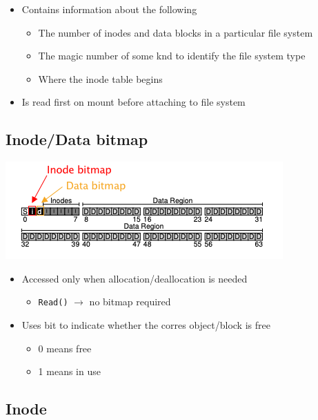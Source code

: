 \documentclass[12pt]{article}
\begin{document}
\begin{itemize}
    \item Contains information about the following
    \begin{itemize}
        \item The number of inodes and data blocks in a particular file system
        \item The magic number of some knd to identify the file system type
        \item Where the inode table begins
    \end{itemize}

    \item Is read first on mount before attaching to file system
\end{itemize}


\subsection{Inode/Data bitmap}

\begin{center}
\includegraphics[width=\linewidth]{../images/midterm_2_solution_22.png}
\end{center}

\begin{itemize}
    \item Accessed only when allocation/deallocation is needed
    \begin{itemize}
        \item \texttt{Read()} $\to$ no bitmap required
    \end{itemize}
    \item Uses bit to indicate whether the corres object/block is free
    \begin{itemize}
        \item 0 means free
        \item 1 means in use
    \end{itemize}
\end{itemize}

\subsection{Inode}
\end{document}
